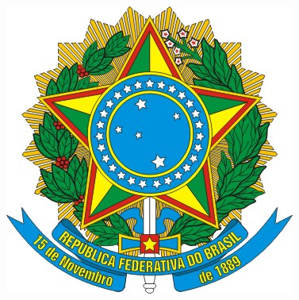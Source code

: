 \newcommand{\imprimirdia}{5} %
\newcommand{\imprimirmes}{dezembro} %

\newcommand{\imprimirbancaO}{Prof. Dr. Nome do orientador}
\newcommand{\imprimirbancaA}{Profa. Dra. Professora da Banca}
\newcommand{\imprimirbancaB}{Prof. Ms. Professor da Banca}

{
	\setlength{\parindent}{0pt}
	\begin{minipage}[c][2.4cm][c]{0.09\textwidth}
		\includegraphics[width=.9\textwidth]{dados/figuras/brasao.jpg}
	\end{minipage}%
	\begin{minipage}[c][2.4cm][t]{0.68\textwidth}
		\begin{center}
			\begin{SingleSpacing}
				\MakeUppercase{\imprimirinstituicao} \\
				\MakeUppercase{\imprimirdepartamento} \\
				\MakeUppercase{\imprimirprograma} \\
			\end{SingleSpacing}
		\end{center}
	\end{minipage}%
	\begin{minipage}[c][2.4cm][c]{0.19\textwidth}

\end{minipage}}
